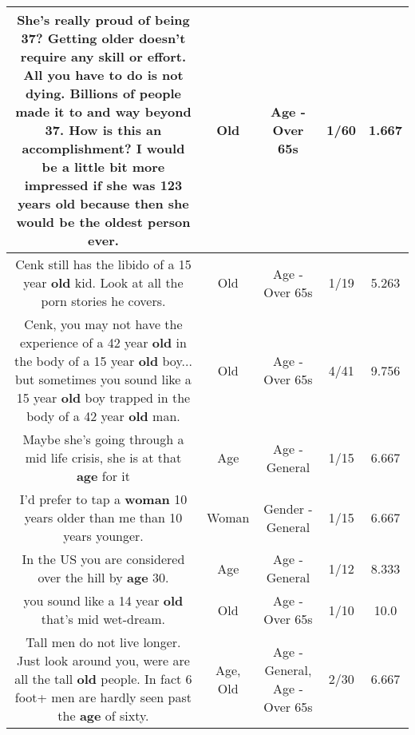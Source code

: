 \documentclass[11pt]{article}
\newlength\mylength
\begin{document}
\begin{center}
\begin{longtable}{|C{.65\mylength}|C{.30\mylength}|C{.12\mylength}|C{.12\mylength}|C{.12\mylength}|}
  \small She's really proud of being 37? Getting older doesn't require any skill or effort. All you have to do is not dying. Billions of people made it to and way beyond 37. How is this an accomplishment? I would be a little bit more impressed if she was 123 years \textbf{old} because then she would be the oldest person ever.\normalsize   & Old & Age - Over 65s & 1/60 & 1.667 \\  \hline
  \small Cenk still has the libido of a 15 year \textbf{old} kid. Look at all the porn stories he covers.\normalsize   & Old & Age - Over 65s & 1/19 & 5.263 \\  \hline
  \small Cenk, you may not have the experience of a 42 year \textbf{old} in the body of a 15 year \textbf{old} boy... but sometimes you sound like a 15 year \textbf{old} boy trapped in the body of a 42 year \textbf{old} man.\normalsize   & Old & Age - Over 65s & 4/41 & 9.756 \\  \hline
  \small Maybe she's going through a mid life crisis, she is at that \textbf{age} for it\normalsize   & Age & Age - General & 1/15 & 6.667 \\  \hline
  \small I'd prefer to tap a \textbf{woman} 10 years older than me than 10 years younger.\normalsize   & Woman & Gender - General & 1/15 & 6.667 \\  \hline
  \small In the US you are considered over the hill by \textbf{age} 30.\normalsize   & Age & Age - General & 1/12 & 8.333 \\  \hline
  \small you sound like a 14 year \textbf{old} that's mid wet-dream.\normalsize   & Old & Age - Over 65s & 1/10 & 10.0 \\  \hline
  \small Tall men do not live longer. Just look around you, were are all the tall \textbf{old} people.  In fact 6 foot+ men are hardly seen past the \textbf{age} of sixty.\normalsize   & Age, Old & Age - General, Age - Over 65s & 2/30 & 6.667 \\  \hline

\end{longtable}
\end{center}
\end{document}
